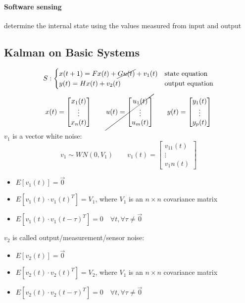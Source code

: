 \documentclass{article}
\begin{document}
\paragraph{Software sensing} determine the internal state using the values measured from input and output

\subsection{Kalman on Basic Systems}
\[
S:
\begin{cases}
x(t+1)=Fx(t)+\cancel{Gu(t)}+v_1(t)&\text{state equation}\\
y(t)=Hx(t)+v_2(t)&\text{output equation}
\end{cases}
\]
\[
x(t)=\begin{bmatrix}
x_1(t)\\\vdots\\x_n(t)
\end{bmatrix}
\qquad
\cancel{
u(t)=\begin{bmatrix}
u_1(t)\\\vdots\\u_m(t)
\end{bmatrix}
}
\qquad
y(t)=\begin{bmatrix}
y_1(t)\\\vdots\\y_p(t)
\end{bmatrix}
\]
$v_1$ is a vector white noise:
\[
v_1 \sim WN(0,V_1)
\qquad
v_1(t)=\begin{bmatrix}
v_11(t)\\\vdots\\v_1n(t)
\end{bmatrix}
\]
\begin{itemize}
\item $E \left[v_1(t)\right]=\vec{0}$
\item $E\left[v_1(t)\cdot v_1(t)^T\right]=V_1$, where $V_1$ is an $n\times n$ covariance matrix
\item $E\left[v_1(t)\cdot v_1(t-\tau)^T\right]=0 \quad \forall t, \forall\tau\neq \vec{0}$
\end{itemize}
$v_2$ is called output/measurement/sensor noise: 
\begin{itemize}
\item $E \left[v_2(t)\right]=\vec{0}$
\item $E\left[v_2(t)\cdot v_2(t)^T\right]=V_2$, where $V_1$ is an $n\times n$ covariance matrix
\item $E\left[v_2(t)\cdot v_2(t-\tau)^T\right]=0 \quad \forall t, \forall\tau\neq \vec{0}$
\end{itemize}
\end{document}
